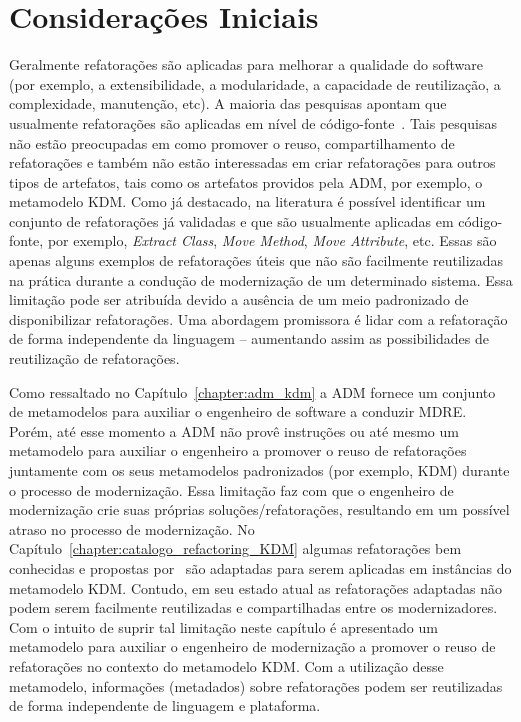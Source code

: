 \section{Considerações Iniciais}\label{sec:consideracoes_iniciais}
Geralmente refatorações são aplicadas para melhorar a qualidade do software (por exemplo, a extensibilidade, a modularidade, a capacidade de reutilização, a complexidade, manutenção, etc). 
A maioria das pesquisas apontam que usualmente refatorações são aplicadas em nível de código-fonte~\cite{Fowler1999, Demeyer1, Demeyer2, Opdy92b}. Tais pesquisas não estão preocupadas em como promover o reuso, compartilhamento de refatorações e também não estão interessadas em criar refatorações para outros tipos de artefatos, tais como os artefatos providos pela ADM, por exemplo, o metamodelo KDM. 
%
Como já destacado, na literatura é possível identificar um conjunto de refatorações já validadas e que são usualmente aplicadas em código-fonte, por exemplo, \textit{Extract Class}, \textit{Move Method}, \textit{Move Attribute}, etc. Essas são apenas alguns exemplos de refatorações úteis que não são facilmente reutilizadas na prática durante a condução de modernização de um determinado sistema. Essa limitação pode ser atribuída devido a ausência de um meio padronizado de disponibilizar refatorações. 
Uma abordagem promissora é lidar com a refatoração de forma independente da linguagem – aumentando assim as possibilidades de reutilização de refatorações.

Como ressaltado no Capítulo~\ref{chapter:adm_kdm} a ADM fornece um conjunto de metamodelos para auxiliar o engenheiro de software a conduzir MDRE. 
Porém, até esse momento a ADM não provê instruções ou até mesmo um metamodelo para auxiliar o engenheiro a promover o reuso de refatorações juntamente com os seus metamodelos padronizados (por exemplo, KDM) durante o processo de modernização. 
Essa limitação faz com que o engenheiro de modernização crie suas próprias soluções/refatorações, resultando em um possível atraso no processo de modernização. 
No Capítulo~\ref{chapter:catalogo_refactoring_KDM} algumas refatorações bem conhecidas e propostas por~ são adaptadas para serem aplicadas em instâncias do metamodelo KDM. Contudo, em seu estado atual as refatorações adaptadas não podem serem facilmente reutilizadas e compartilhadas entre os modernizadores. 
Com o intuito de suprir tal limitação neste capítulo é apresentado um metamodelo para auxiliar o engenheiro de modernização a promover o reuso de refatorações no contexto do metamodelo KDM. Com a utilização desse metamodelo, informações (metadados) sobre refatorações podem ser reutilizadas de forma independente de linguagem e plataforma. 

